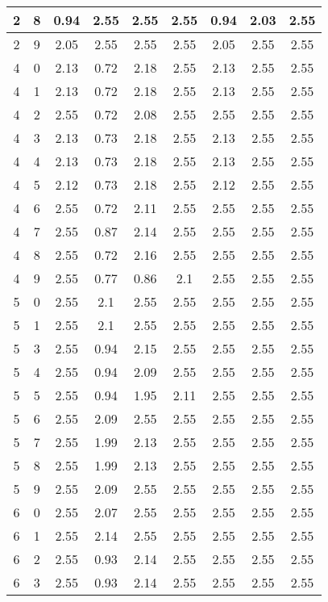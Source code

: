 \begin{longtable}{|c|c||c||c|c|c||c|c|c|}
	2 & 8 & 0.94 & 2.55 & 2.55 & 2.55 & 0.94 & 2.03 & 2.55 \\ \hline
	2 & 9 & 2.05 & 2.55 & 2.55 & 2.55 & 2.05 & 2.55 & 2.55 \\ \hline
	4 & 0 & 2.13 & 0.72 & 2.18 & 2.55 & 2.13 & 2.55 & 2.55 \\ \hline
	4 & 1 & 2.13 & 0.72 & 2.18 & 2.55 & 2.13 & 2.55 & 2.55 \\ \hline
	4 & 2 & 2.55 & 0.72 & 2.08 & 2.55 & 2.55 & 2.55 & 2.55 \\ \hline
	4 & 3 & 2.13 & 0.73 & 2.18 & 2.55 & 2.13 & 2.55 & 2.55 \\ \hline
	4 & 4 & 2.13 & 0.73 & 2.18 & 2.55 & 2.13 & 2.55 & 2.55 \\ \hline
	4 & 5 & 2.12 & 0.73 & 2.18 & 2.55 & 2.12 & 2.55 & 2.55 \\ \hline
	4 & 6 & 2.55 & 0.72 & 2.11 & 2.55 & 2.55 & 2.55 & 2.55 \\ \hline
	4 & 7 & 2.55 & 0.87 & 2.14 & 2.55 & 2.55 & 2.55 & 2.55 \\ \hline
	4 & 8 & 2.55 & 0.72 & 2.16 & 2.55 & 2.55 & 2.55 & 2.55 \\ \hline
	4 & 9 & 2.55 & 0.77 & 0.86 & 2.1 & 2.55 & 2.55 & 2.55 \\ \hline
	5 & 0 & 2.55 & 2.1 & 2.55 & 2.55 & 2.55 & 2.55 & 2.55 \\ \hline
	5 & 1 & 2.55 & 2.1 & 2.55 & 2.55 & 2.55 & 2.55 & 2.55 \\ \hline
	5 & 3 & 2.55 & 0.94 & 2.15 & 2.55 & 2.55 & 2.55 & 2.55 \\ \hline
	5 & 4 & 2.55 & 0.94 & 2.09 & 2.55 & 2.55 & 2.55 & 2.55 \\ \hline
	5 & 5 & 2.55 & 0.94 & 1.95 & 2.11 & 2.55 & 2.55 & 2.55 \\ \hline
	5 & 6 & 2.55 & 2.09 & 2.55 & 2.55 & 2.55 & 2.55 & 2.55 \\ \hline
	5 & 7 & 2.55 & 1.99 & 2.13 & 2.55 & 2.55 & 2.55 & 2.55 \\ \hline
	5 & 8 & 2.55 & 1.99 & 2.13 & 2.55 & 2.55 & 2.55 & 2.55 \\ \hline
	5 & 9 & 2.55 & 2.09 & 2.55 & 2.55 & 2.55 & 2.55 & 2.55 \\ \hline
	6 & 0 & 2.55 & 2.07 & 2.55 & 2.55 & 2.55 & 2.55 & 2.55 \\ \hline
	6 & 1 & 2.55 & 2.14 & 2.55 & 2.55 & 2.55 & 2.55 & 2.55 \\ \hline
	6 & 2 & 2.55 & 0.93 & 2.14 & 2.55 & 2.55 & 2.55 & 2.55 \\ \hline
	6 & 3 & 2.55 & 0.93 & 2.14 & 2.55 & 2.55 & 2.55 & 2.55 \\ \hline

\end{longtable}
